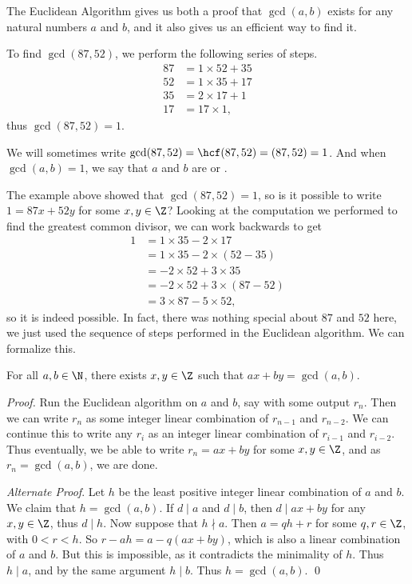 The Euclidean Algorithm gives us both a proof that $\gcd(a, b)$ exists for any natural numbers $a$ and $b$, and it also gives us an efficient way to find it.

\begin{example}
	To find $\gcd(87, 52)$, we perform the following series of steps.
	\begin{align*}
		87 &= 1 \times 52 + 35 \\
		52 &= 1 \times 35 + 17 \\
		35 &= 2 \times 17 + 1\\
		17 &= 17 \times 1,
	\end{align*}
	thus $\gcd(87, 52) = 1$.
\end{example}

\begin{notation}
	We will sometimes write $\gcd(87, 52) = \hcf(87, 52) = (87, 52) = 1$. And when $\gcd(a, b) = 1$, we say that $a$ and $b$ are  or .
\end{notation}

The example above showed that $\gcd(87, 52) = 1$, so is it possible to write $1 = 87x + 52y$ for some $x,y \in \Z$?
Looking at the computation we performed to find the greatest common divisor, we can work backwards to get
\begin{align*}
	1 &= 1 \times 35 - 2 \times 17 \\
	  &= 1 \times 35 - 2 \times (52 - 35) \\
	  &= -2 \times 52 + 3 \times 35 \\
	  &= -2\times 52 + 3 \times (87 - 52) \\
	  &= 3\times 87 - 5 \times 52,
\end{align*}
so it is indeed possible. In fact, there was nothing special about $87$ and $52$ here, we just used the sequence of steps performed in the Euclidean algorithm. We can formalize this.

\begin{theorem}
	For all $a, b \in \N$, there exists $x, y \in \Z$ such that $ax + by = \gcd(a, b)$.
\end{theorem}
\begin{proof} 
	Run the Euclidean algorithm on $a$ and $b$, say with some output $r_n$. Then we can write $r_n$ as some integer linear combination of $r_{n - 1}$ and $r_{n - 2}$.
	We can continue this to write any $r_i$ as an integer linear combination of $r_{i - 1}$ and $r_{i - 2}$. Thus eventually, we be able to write $r_n = ax + by$ for some $x, y \in \Z$, and as $r_n = \gcd(a, b)$, we are done. \hfill \qedhere

	\emph{Alternate Proof}. Let $h$ be the least positive integer linear combination of $a$ and $b$. We claim that $h = \gcd(a, b)$. If $d \mid a$ and $d \mid b$, then $d \mid ax + by$ for any $x, y \in \Z$, thus $d \mid h$. Now suppose that $h \nmid a$. Then $a = qh + r$ for some $q, r \in \Z$, with $0 < r < h$. So $r - ah = a - q(ax + by)$, which is also a linear combination of $a$ and $b$. But this is impossible, as it contradicts the minimality of $h$. Thus $h \mid a$, and by the same argument $h \mid b$. Thus $h = \gcd(a, b)$. \hfill \qed
\end{proof}

